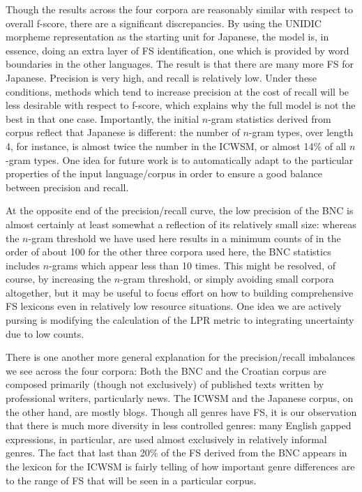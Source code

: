 \documentclass[11pt,letterpaper]{article}
\begin{document}
Though the results across the four corpora are reasonably similar with respect to overall f-score, there are a significant discrepancies. By using the UNIDIC morpheme representation as the starting unit for Japanese, the model is, in essence, doing an extra layer of FS identification, one which is provided by word boundaries in the other languages. The result is that there are many more FS for Japanese. Precision is very high, and recall is relatively low. Under these conditions, methods which tend to increase precision at the cost of recall will be less desirable with respect to f-score, which explains why the full model is not the best in that one case.  Importantly, the initial $n$-gram statistics derived from corpus reflect that Japanese is different: the number of $n$-gram types, over length 4, for instance, is almost twice the number in the ICWSM, or almost 14\% of all $n$-gram types. One idea for future work is to automatically adapt to the particular properties of the input language/corpus in order to ensure a good balance between precision and recall.

At the opposite end of the precision/recall curve, the low precision of the BNC is almost certainly at least somewhat a reflection of its relatively small size: whereas the $n$-gram threshold we have used here results in a minimum counts of in the order of about 100 for the other three corpora used here, the BNC statistics includes $n$-grams which appear less than 10 times. This might be resolved, of course, by increasing the $n$-gram threshold, or simply avoiding small corpora altogether, but it may be useful to focus effort on how to building comprehensive FS lexicons even in relatively low resource situations. One idea we are actively pursing is modifying the calculation of the LPR metric to integrating uncertainty due to low counts.

There is one another more general explanation for the precision/recall imbalances we see across the four corpora: Both the BNC and the Croatian corpus are composed primarily (though not exclusively) of published texts written by professional writers, particularly news. The ICWSM and the Japanese corpus, on the other hand, are mostly blogs. Though all genres have FS, it is our observation that there is much more diversity in less controlled genres: many English gapped expressions, in particular, are used almost exclusively in relatively informal genres. The fact that last than 20\% of the FS derived from the BNC appears in the lexicon for the ICWSM is fairly telling of how important genre differences are to the range of FS that will be seen in a particular corpus.
\end{document}
